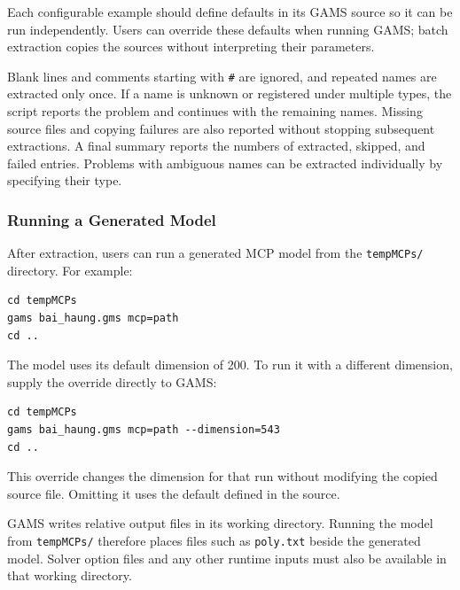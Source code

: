 Each configurable example should define defaults in its GAMS source so it can be run independently. Users can override these defaults when running GAMS; batch extraction copies the sources without interpreting their parameters.

Blank lines and comments starting with \texttt{\#} are ignored, and repeated names are extracted only once. If a name is unknown or registered under multiple types, the script reports the problem and continues with the remaining names. Missing source files and copying failures are also reported without stopping subsequent extractions. A final summary reports the numbers of extracted, skipped, and failed entries. Problems with ambiguous names can be extracted individually by specifying their type.

\subsubsection{Running a Generated Model}

After extraction, users can run a generated MCP model from the \texttt{tempMCPs/} directory. For example:

\begin{verbatim}
cd tempMCPs
gams bai_haung.gms mcp=path
cd ..
\end{verbatim}

The model uses its default dimension of 200. To run it with a different dimension, supply the override directly to GAMS:

\begin{verbatim}
cd tempMCPs
gams bai_haung.gms mcp=path --dimension=543
cd ..
\end{verbatim}

This override changes the dimension for that run without modifying the copied source file. Omitting it uses the default defined in the source.

GAMS writes relative output files in its working directory. Running the model from \texttt{tempMCPs/} therefore places files such as \texttt{poly.txt} beside the generated model. Solver option files and any other runtime inputs must also be available in that working directory.

